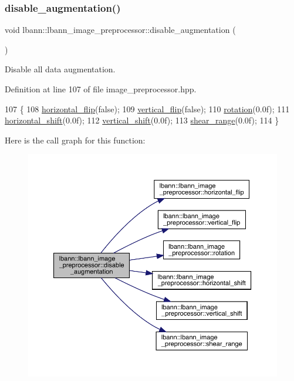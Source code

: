 \subsubsection{\texorpdfstring{disable\+\_\+augmentation()}{disable\_augmentation()}}
{\footnotesize\ttfamily void lbann\+::lbann\+\_\+image\+\_\+preprocessor\+::disable\+\_\+augmentation (\begin{DoxyParamCaption}{ }\end{DoxyParamCaption})\hspace{0.3cm}{\ttfamily [inline]}}

Disable all data augmentation. 

Definition at line 107 of file image\+\_\+preprocessor.\+hpp.


\begin{DoxyCode}
107                               \{
108     \hyperlink{classlbann_1_1lbann__image__preprocessor_a4ba2de0a781dfa0a2652ad4d777a241f}{horizontal\_flip}(\textcolor{keyword}{false});
109     \hyperlink{classlbann_1_1lbann__image__preprocessor_aeb7d75e4d3361ae2836afabc14510d74}{vertical\_flip}(\textcolor{keyword}{false});
110     \hyperlink{classlbann_1_1lbann__image__preprocessor_a1a293733368dd9eceba3e99cf9e5ae24}{rotation}(0.0f);
111     \hyperlink{classlbann_1_1lbann__image__preprocessor_ae62596b4af5d1940aa0499cde2bdd005}{horizontal\_shift}(0.0f);
112     \hyperlink{classlbann_1_1lbann__image__preprocessor_a50ac63e1f6b1b9806cbf6c06f53f4aca}{vertical\_shift}(0.0f);
113     \hyperlink{classlbann_1_1lbann__image__preprocessor_aef1e2375fd518e69df800b0dcbcb37d0}{shear\_range}(0.0f);
114   \}
\end{DoxyCode}
Here is the call graph for this function\+:\nopagebreak
\begin{figure}[H]
\begin{center}
\leavevmode
\includegraphics[width=350pt]{classlbann_1_1lbann__image__preprocessor_a871cb543ee6c132a76e16045a1a2a9f3_cgraph}
\end{center}
\end{figure}
